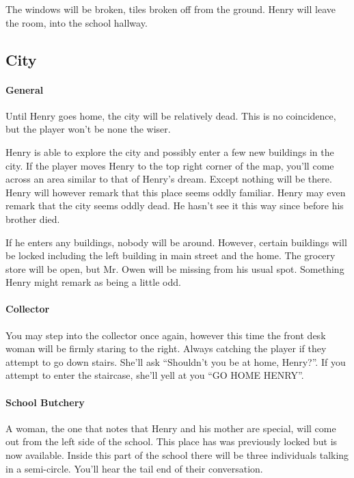 \documentclass[12pt, a4paper, titlepage]{article}
\begin{document}
            The windows will be broken, tiles broken off from the ground. Henry will leave the room, into the school hallway. 
           
        \subsection{City}

	\paragraph{General}
        Until Henry goes home, the city will be relatively dead. This is no coincidence, but the player won't be none the wiser.
        
        Henry is able to explore the city and possibly enter a few new buildings in the city. If the player moves Henry to the top right corner of the map, you'll come across an area similar
        to that of Henry's dream. Except nothing will be there. Henry will however remark that this place seems oddly familiar. Henry may even remark that the city seems oddly dead. He 
        hasn't see it this way since before his brother died.
        
        If he enters any buildings, nobody will be around. However, certain buildings will be locked including the left building in main street and the home. The grocery store will be open, but 	Mr. 	Owen will be missing from his usual spot. Something Henry might remark as being a little odd.
        
        \paragraph{Collector}
        
        You may step into the collector once again, however this time the front desk woman will be firmly staring to the right. Always catching the player if they attempt to go down stairs. She'll ask ``Shouldn't you be at home, Henry?''. If you attempt to enter the staircase, she'll yell at you ``GO HOME HENRY''.

	\paragraph{School Butchery}
	A woman, the one that notes that Henry and his mother are special, will come out from the left side of the school. This place has was previously locked but is now available. Inside this
	part of the school there will be three individuals talking in a semi-circle. You'll hear the tail end of their conversation.\\
\end{document}

